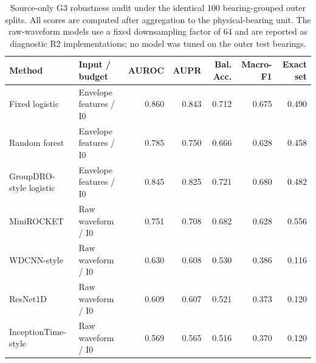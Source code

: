 \begin{table}[t]
\centering
\footnotesize
\setlength{\tabcolsep}{5pt}
\renewcommand{\arraystretch}{1.12}
\caption{Source-only G3 robustness audit under the identical 100 bearing-grouped outer splits. All scores are computed after aggregation to the physical-bearing unit. The raw-waveform models use a fixed downsampling factor of 64 and are reported as diagnostic R2 implementations; no model was tuned on the outer test bearings.}
\label{tab:g3-audit}
\begin{tabular}{l l r r r r r}
\toprule
Method & Input / budget & AUROC & AUPR & Bal. Acc. & Macro-F1 & Exact set \\
\midrule
Fixed logistic & Envelope features / I0 & 0.860 & 0.843 & 0.712 & 0.675 & 0.490 \\
Random forest & Envelope features / I0 & 0.785 & 0.750 & 0.666 & 0.628 & 0.458 \\
GroupDRO-style logistic & Envelope features / I0 & 0.845 & 0.825 & 0.721 & 0.680 & 0.482 \\
MiniROCKET & Raw waveform / I0 & 0.751 & 0.708 & 0.682 & 0.628 & 0.556 \\
WDCNN-style & Raw waveform / I0 & 0.630 & 0.608 & 0.530 & 0.386 & 0.116 \\
ResNet1D & Raw waveform / I0 & 0.609 & 0.607 & 0.521 & 0.373 & 0.120 \\
InceptionTime-style & Raw waveform / I0 & 0.569 & 0.565 & 0.516 & 0.370 & 0.120 \\
\bottomrule
\end{tabular}
\end{table}
